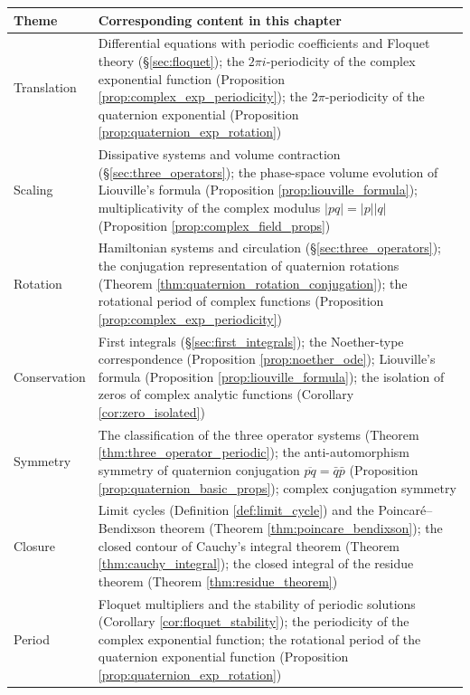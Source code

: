 \begingroup
\begin{longtable}{>{\raggedright\arraybackslash}p{3cm}>{\raggedright\arraybackslash}p{10.5cm}}
\toprule
Theme & Corresponding content in this chapter \\
\midrule
Translation & Differential equations with periodic coefficients and Floquet theory (\S\ref{sec:floquet}); the $2\pi i$-periodicity of the complex exponential function (Proposition \ref{prop:complex_exp_periodicity}); the $2\pi$-periodicity of the quaternion exponential (Proposition \ref{prop:quaternion_exp_rotation}) \\
Scaling & Dissipative systems and volume contraction (\S\ref{sec:three_operators}); the phase-space volume evolution of Liouville's formula (Proposition \ref{prop:liouville_formula}); multiplicativity of the complex modulus $|pq| = |p||q|$ (Proposition \ref{prop:complex_field_props}) \\
Rotation & Hamiltonian systems and circulation (\S\ref{sec:three_operators}); the conjugation representation of quaternion rotations (Theorem \ref{thm:quaternion_rotation_conjugation}); the rotational period of complex functions (Proposition \ref{prop:complex_exp_periodicity}) \\
Conservation & First integrals (\S\ref{sec:first_integrals}); the Noether-type correspondence (Proposition \ref{prop:noether_ode}); Liouville's formula (Proposition \ref{prop:liouville_formula}); the isolation of zeros of complex analytic functions (Corollary \ref{cor:zero_isolated}) \\
Symmetry & The classification of the three operator systems (Theorem \ref{thm:three_operator_periodic}); the anti-automorphism symmetry of quaternion conjugation $\overline{pq} = \bar q \bar p$ (Proposition \ref{prop:quaternion_basic_props}); complex conjugation symmetry \\
Closure & Limit cycles (Definition \ref{def:limit_cycle}) and the Poincaré--Bendixson theorem (Theorem \ref{thm:poincare_bendixson}); the closed contour of Cauchy's integral theorem (Theorem \ref{thm:cauchy_integral}); the closed integral of the residue theorem (Theorem \ref{thm:residue_theorem}) \\
Period & Floquet multipliers and the stability of periodic solutions (Corollary \ref{cor:floquet_stability}); the periodicity of the complex exponential function; the rotational period of the quaternion exponential function (Proposition \ref{prop:quaternion_exp_rotation}) \\
\bottomrule
\end{longtable}
\endgroup

